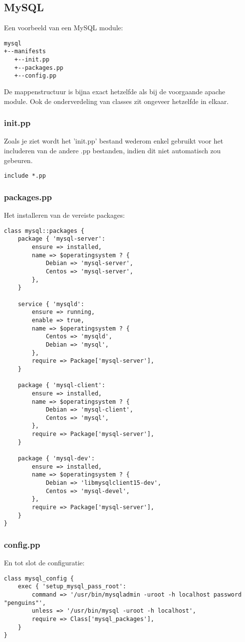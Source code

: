 \subsection{MySQL}
Een voorbeeld van een MySQL module:
%
\begin{code}
\begin{lstlisting}
mysql
+--manifests
   +--init.pp
   +--packages.pp
   +--config.pp
\end{lstlisting}
\end{code}
%
De mappenstructuur is bijna exact hetzelfde als bij de voorgaande apache module. Ook de onderverdeling van classes zit ongeveer hetzelfde in elkaar.
%
\subsubsection{init.pp}
Zoals je ziet wordt het 'init.pp' bestand wederom enkel gebruikt voor het includeren van de andere .pp bestanden, indien dit niet automatisch zou gebeuren.
%
\begin{code}
\begin{lstlisting}
include *.pp
\end{lstlisting}
\end{code}
%
\subsubsection{packages.pp}
Het installeren van de vereiste packages:
\begin{code}
\begin{lstlisting}
class mysql::packages {
	package { 'mysql-server':
		ensure => installed,
		name => $operatingsystem ? {
			Debian => 'mysql-server',
			Centos => 'mysql-server',
		},
	}

	service { 'mysqld':
		ensure => running,
		enable => true,
		name => $operatingsystem ? {
			Centos => 'mysqld',
			Debian => 'mysql',
		},
		require => Package['mysql-server'],
	}

	package { 'mysql-client':
		ensure => installed,
		name => $operatingsystem ? {
			Debian => 'mysql-client',
			Centos => 'mysql',
		},
		require => Package['mysql-server'],
	}

	package { 'mysql-dev':
		ensure => installed,
		name => $operatingsystem ? {
			Debian => 'libmysqlclient15-dev',
			Centos => 'mysql-devel',
		},
		require => Package['mysql-server'],
	}
}
\end{lstlisting}
\end{code}
%
\subsubsection{config.pp}
En tot slot de configuratie:
\begin{code}
\begin{lstlisting}
class mysql_config {
	exec { 'setup_mysql_pass_root':
		command => '/usr/bin/mysqladmin -uroot -h localhost password "penguins"',
		unless => '/usr/bin/mysql -uroot -h localhost',
		require => Class['mysql_packages'],
	}
}
\end{lstlisting}
\end{code}
